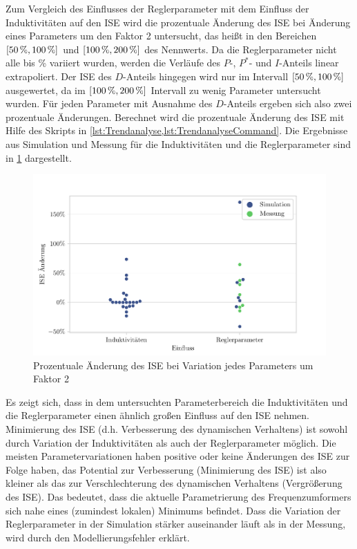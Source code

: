 Zum Vergleich des Einflusses der Reglerparameter mit dem Einfluss der Induktivitäten auf den ISE wird die prozentuale Änderung des ISE bei Änderung eines Parameters um den Faktor 2 untersucht, das heißt in den Bereichen $[\unit[50]{\%},\unit[100]{\%}]$ und $[\unit[100]{\%},\unit[200]{\%}]$ des Nennwerts. Da die Reglerparameter nicht alle bis \unit[200]{\%} variiert wurden, werden die Verläufe des $P$-, $P^*$- und $I$-Anteils linear extrapoliert. Der ISE des $D$-Anteils hingegen wird nur im Intervall $[\unit[50]{\%},\unit[100]{\%}]$ ausgewertet, da im $[\unit[100]{\%},\unit[200]{\%}]$ Intervall zu wenig Parameter untersucht wurden. Für jeden Parameter mit Ausnahme des $D$-Anteils ergeben sich also zwei prozentuale Änderungen. Berechnet wird die prozentuale Änderung des ISE mit Hilfe des Skripts in \cref{lst:Trendanalyse,lst:TrendanalyseCommand}. Die Ergebnisse aus Simulation und Messung für die Induktivitäten und die Reglerparameter sind in \cref{fig:trend_manager_scatter} dargestellt.
\begin{figure}
    \centering
    \includegraphics{Bilder/trend_manager_scatter.pdf}
    \caption{Prozentuale Änderung des ISE bei Variation jedes Parameters um Faktor 2}
    \label{fig:trend_manager_scatter}
\end{figure}

Es zeigt sich, dass in dem untersuchten Parameterbereich die Induktivitäten und die Reglerparameter einen ähnlich großen Einfluss auf den ISE nehmen. Minimierung des ISE (d.h. Verbesserung des dynamischen Verhaltens) ist sowohl durch Variation der Induktivitäten als auch der Reglerparameter möglich. Die meisten Parametervariationen haben positive oder keine Änderungen des ISE zur Folge haben, das Potential zur Verbesserung (Minimierung des ISE) ist also kleiner als das zur Verschlechterung des dynamischen Verhaltens (Vergrößerung des ISE). Das bedeutet, dass die aktuelle Parametrierung des Frequenzumformers sich nahe eines (zumindest lokalen) Minimums befindet. Dass die Variation der Reglerparameter in der Simulation stärker auseinander läuft als in der Messung, wird durch den Modellierungsfehler erklärt. 

